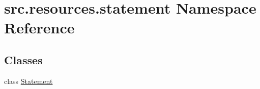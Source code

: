 \hypertarget{namespacesrc_1_1resources_1_1statement}{\section{src.\+resources.\+statement Namespace Reference}
\label{namespacesrc_1_1resources_1_1statement}
}
\subsection*{Classes}
\begin{DoxyCompactItemize}
\item 
class \hyperlink{classsrc_1_1resources_1_1statement_1_1_statement}{Statement}
\end{DoxyCompactItemize}
